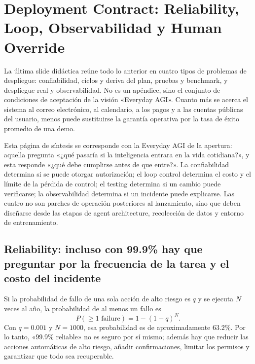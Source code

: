 \section{Deployment Contract: Reliability, Loop, Observabilidad y Human Override}

La última slide didáctica reúne todo lo anterior en cuatro tipos de problemas de despliegue: confiabilidad, ciclos y deriva del plan, pruebas y benchmark, y despliegue real y observabilidad. No es un apéndice, sino el conjunto de condiciones de aceptación de la visión «Everyday AGI». Cuanto más se acerca el sistema al correo electrónico, al calendario, a los pagos y a las cuentas públicas del usuario, menos puede sustituirse la garantía operativa por la tasa de éxito promedio de una demo.


Esta página de síntesis se corresponde con la Everyday AGI de la apertura: aquella pregunta «¿qué pasaría si la inteligencia entrara en la vida cotidiana?», y esta responde «¿qué debe cumplirse antes de que entre?». La confiabilidad determina si se puede otorgar autorización; el loop control determina el costo y el límite de la pérdida de control; el testing determina si un cambio puede verificarse; la observabilidad determina si un incidente puede explicarse. Las cuatro no son parches de operación posteriores al lanzamiento, sino que deben diseñarse desde las etapas de agent architecture, recolección de datos y entorno de entrenamiento.

\subsection{Reliability: incluso con 99.9\% hay que preguntar por la frecuencia de la tarea y el costo del incidente}

Si la probabilidad de fallo de una sola acción de alto riesgo es $q$ y se ejecuta $N$ veces al año, la probabilidad de al menos un fallo es
\[
P(\ge 1\text{ failure})=1-(1-q)^N.
\]
Con $q=0.001$ y $N=1000$, esa probabilidad es de aproximadamente $63.2\%$. Por lo tanto, «99.9\% reliable» no es seguro por sí mismo; además hay que reducir las acciones automáticas de alto riesgo, añadir confirmaciones, limitar los permisos y garantizar que todo sea recuperable.


